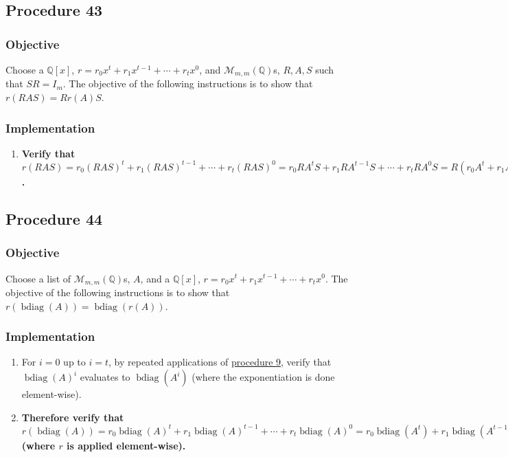 \documentclass[twocolumn]{article}
\DeclareMathOperator{\bdiag}{bdiag}
\begin{document}
		\subsection{Procedure 43}\label{sec:procedure 43}
			\subsubsection{Objective}
				Choose a $\mathbb{Q}[x]$, $r=r_0x^t+r_1x^{t-1}+\cdots+r_tx^0$, and $\mathcal{M}_{m,m}(\mathbb{Q})$s, $R,A,S$ such that $SR=I_m$. The objective of the following instructions is to show that $r(RAS)=Rr(A)S$.
			\subsubsection{Implementation}
				\begin{enumerate}
					\item \textbf{Verify that $r(RAS)=r_0(RAS)^t+r_1(RAS)^{t-1}+\cdots+r_t(RAS)^0=r_0RA^tS+r_1RA^{t-1}S+\cdots+r_tRA^0S=R(r_0A^t+r_1A^{t-1}+\cdots+r_tA^0)S=Rr(A)S$.}
				\end{enumerate}
		\subsection{Procedure 44}\label{sec:procedure 44}
			\subsubsection{Objective}
				Choose a list of $\mathcal{M}_{m,m}(\mathbb{Q})$s, $A$, and a $\mathbb{Q}[x]$, $r=r_0x^t+r_1x^{t-1}+\cdots+r_tx^0$. The objective of the following instructions is to show that $r(\bdiag(A))=\bdiag(r(A))$.
			\subsubsection{Implementation}
				\begin{enumerate}
					\item For $i=0$ up to $i=t$, by repeated applications of \hyperref[sec:procedure 9]{procedure 9}, verify that $\bdiag(A)^i$ evaluates to $\bdiag(A^i)$ (where the exponentiation is done element-wise).
					\item \textbf{Therefore verify that $r(\bdiag(A))=r_0\bdiag(A)^t+r_1\bdiag(A)^{t-1}+\cdots+r_t\bdiag(A)^0=r_0\bdiag(A^t)+r_1\bdiag(A^{t-1})+\cdots+r_t\bdiag(A^0)=\bdiag(r_0A^t)+\bdiag(r_1A^{t-1})+\cdots+\bdiag(r_tA^0)=\bdiag(r(A))$ (where $r$ is applied element-wise).}
				\end{enumerate}
\end{document}
